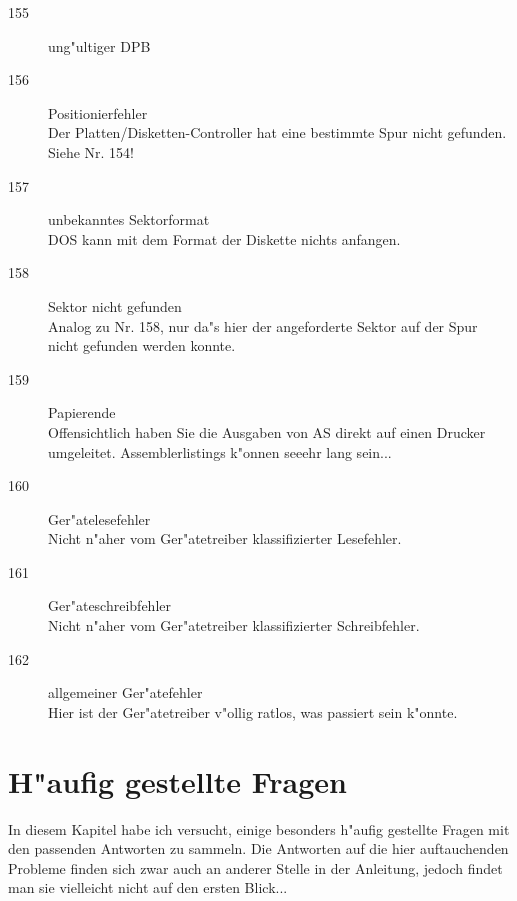 \documentclass[12pt,a4paper,twoside]{report}
\begin{document}
\begin{description}
\item[155]{ung"ultiger DPB}

\item[156]{Positionierfehler\\
           Der Platten/Disketten-Controller hat eine bestimmte Spur nicht
           gefunden.  Siehe Nr. 154!}

\item[157]{unbekanntes Sektorformat\\
           DOS kann mit dem Format der Diskette nichts anfangen.}

\item[158]{Sektor nicht gefunden\\
           Analog zu Nr. 158, nur da"s hier der angeforderte Sektor auf
           der Spur nicht gefunden werden konnte.}

\item[159]{Papierende\\
           Offensichtlich haben Sie die Ausgaben von AS direkt auf einen
           Drucker umgeleitet.  Assemblerlistings k"onnen seeehr lang
           sein...}

\item[160]{Ger"atelesefehler\\
           Nicht n"aher vom Ger"atetreiber klassifizierter Lesefehler.}

\item[161]{Ger"ateschreibfehler\\
           Nicht n"aher vom Ger"atetreiber klassifizierter Schreibfehler.}

\item[162]{allgemeiner Ger"atefehler\\
           Hier ist der Ger"atetreiber v"ollig ratlos, was passiert
           sein k"onnte.}
\end{description}


\cleardoublepage
\chapter{H"aufig gestellte Fragen}

In diesem Kapitel habe ich versucht, einige besonders h"aufig gestellte
Fragen mit den passenden Antworten zu sammeln.  Die Antworten auf
die hier auftauchenden Probleme finden sich zwar auch an anderer
Stelle in der Anleitung, jedoch findet man sie vielleicht nicht auf
den ersten Blick...
\end{document}
